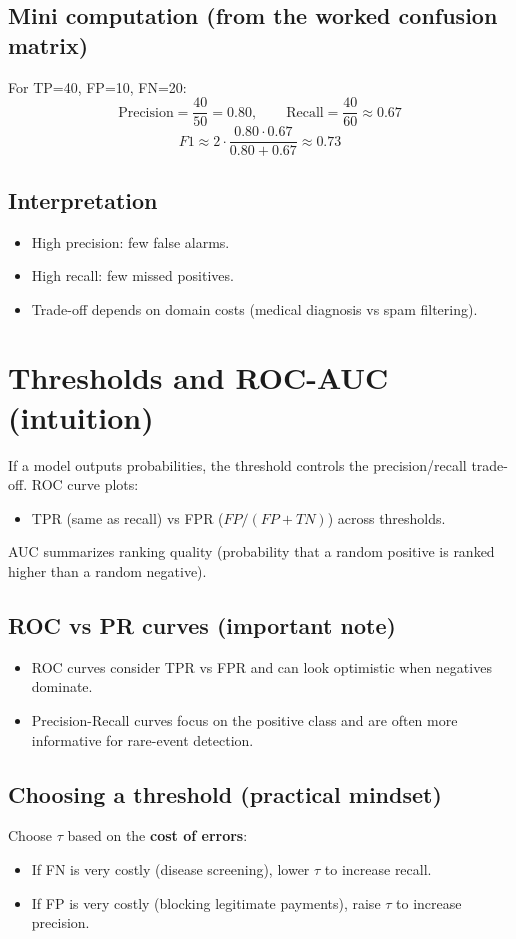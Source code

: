\documentclass[11pt]{article}
\begin{document}
\subsection{Mini computation (from the worked confusion matrix)}
For TP=40, FP=10, FN=20:
\[
  \text{Precision}=\frac{40}{50}=0.80,\qquad
  \text{Recall}=\frac{40}{60}\approx 0.67
\]
\[
  F1 \approx 2\cdot \frac{0.80\cdot 0.67}{0.80+0.67}\approx 0.73
\]

\subsection{Interpretation}
\begin{itemize}[leftmargin=*]
  \item High precision: few false alarms.
  \item High recall: few missed positives.
  \item Trade-off depends on domain costs (medical diagnosis vs spam filtering).
\end{itemize}

\section{Thresholds and ROC-AUC (intuition)}
If a model outputs probabilities, the threshold controls the precision/recall trade-off.
ROC curve plots:
\begin{itemize}[leftmargin=*]
  \item TPR (same as recall) vs FPR ($FP/(FP+TN)$) across thresholds.
\end{itemize}
AUC summarizes ranking quality (probability that a random positive is ranked higher than a random negative).

\subsection{ROC vs PR curves (important note)}
\begin{itemize}[leftmargin=*]
  \item ROC curves consider TPR vs FPR and can look optimistic when negatives dominate.
  \item Precision-Recall curves focus on the positive class and are often more informative for rare-event detection.
\end{itemize}

\subsection{Choosing a threshold (practical mindset)}
Choose $\tau$ based on the \textbf{cost of errors}:
\begin{itemize}[leftmargin=*]
  \item If FN is very costly (disease screening), lower $\tau$ to increase recall.
  \item If FP is very costly (blocking legitimate payments), raise $\tau$ to increase precision.
\end{itemize}
\end{document}
